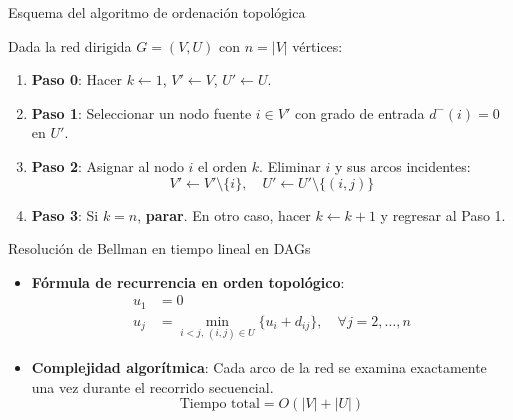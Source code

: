\documentclass[
  ignorenonframetext,
]{beamer}
\providecommand{\tightlist}{%
  \setlength{\itemsep}{0pt}\setlength{\parskip}{0pt}}
\begin{document}
\begin{frame}{Esquema del algoritmo de ordenación topológica}
\label{esquema-del-algoritmo-de-ordenaciuxf3n-topoluxf3gica}
\begin{tcolorbox}[enhanced jigsaw, colframe=quarto-callout-note-color-frame, toptitle=1mm, colback=white, colbacktitle=quarto-callout-note-color!10!white, titlerule=0mm, breakable, coltitle=black, opacityback=0, bottomrule=.15mm, title=\textcolor{quarto-callout-note-color}{\faInfo}\hspace{0.5em}{Algoritmo de numeración topológica}, rightrule=.15mm, arc=.35mm, leftrule=.75mm, left=2mm, toprule=.15mm, bottomtitle=1mm, opacitybacktitle=0.6]

Dada la red dirigida \(G = (V, U)\) con \(n = |V|\) vértices:

\begin{enumerate}
\tightlist
\item
  \textbf{Paso 0}: Hacer \(k \leftarrow 1\), \(V' \leftarrow V\),
  \(U' \leftarrow U\).
\item
  \textbf{Paso 1}: Seleccionar un nodo fuente \(i \in V'\) con grado de
  entrada \(d^-(i) = 0\) en \(U'\).
\item
  \textbf{Paso 2}: Asignar al nodo \(i\) el orden \(k\). Eliminar \(i\)
  y sus arcos incidentes:
  \[V' \leftarrow V' \setminus \{i\}, \quad U' \leftarrow U' \setminus \{ (i, j) \}\]
\item
  \textbf{Paso 3}: Si \(k = n\), \textbf{parar}. En otro caso, hacer
  \(k \leftarrow k + 1\) y regresar al Paso 1.
\end{enumerate}

\end{tcolorbox}
\end{frame}

\begin{frame}{Resolución de Bellman en tiempo lineal en DAGs}
\label{resoluciuxf3n-de-bellman-en-tiempo-lineal-en-dags}
\begin{itemize}
\item
  \textbf{Fórmula de recurrencia en orden topológico}: \[
  \begin{aligned}
  u_1 &= 0 \\
  u_j &= \min_{i < j, \, (i, j) \in U} \{ u_i + d_{ij} \}, \quad \forall j = 2, \dots, n
  \end{aligned}
  \]
\item
  \textbf{Complejidad algorítmica}: Cada arco de la red se examina
  exactamente una vez durante el recorrido secuencial.
  \[\text{Tiempo total} = O(|V| + |U|)\]
\end{itemize}
\end{frame}
\end{document}

